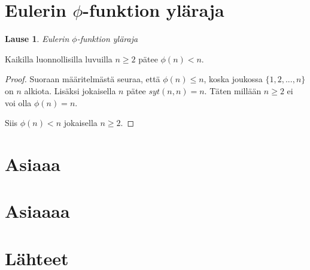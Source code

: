 \documentclass{article}
\theoremstyle{definition}
\newtheorem{lause}[subsection]{Lause}
\begin{document}
\section{Eulerin $\phi$-funktion yläraja}

\begin{lause}{\emph{Eulerin $\phi$-funktion yläraja}}

Kaikilla luonnollisilla luvuilla $n \geq 2$ pätee $\phi(n) < n$.

\begin{proof}

Suoraan määritelmästä seuraa, että $\phi(n) \leq n$, koska joukossa $\{1,2,...,n\}$ on $n$ alkiota. Lisäksi jokaisella $n$ pätee $syt(n,n) = n$. Täten millään $n \geq 2$ ei voi olla $\phi(n) = n$.

Siis $\phi(n) < n$ jokaisella $n \geq 2$.

\end{proof}

\end{lause}

\section{Asiaaa}

\section{Asiaaaa}

\section{Lähteet}
\end{document}
